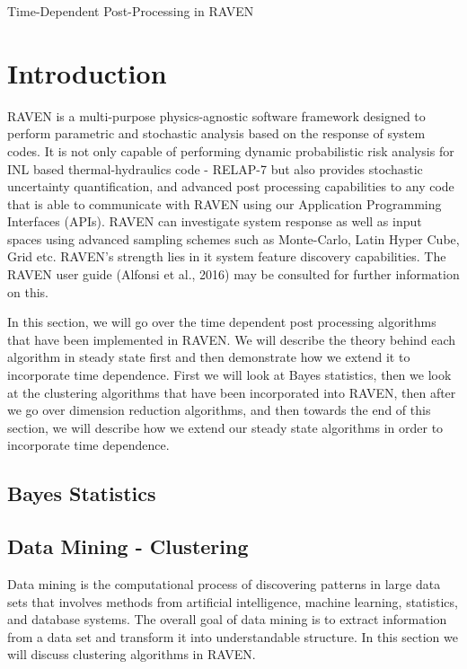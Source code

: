 \documentclass[11pt]{article}
\begin{document}
\begin{center}
\begin{Huge}

Time-Dependent Post-Processing in RAVEN

\end{Huge}
\end{center}

\section{Introduction}

RAVEN is a multi-purpose physics-agnostic software framework designed to perform parametric and stochastic analysis based on the response of system codes. It is not only capable of performing dynamic probabilistic risk analysis for INL based thermal-hydraulics code - RELAP-7 but also provides stochastic uncertainty quantification, and advanced post processing capabilities to any code that is able to communicate with RAVEN using our Application Programming Interfaces (APIs). RAVEN can investigate system response as well as input spaces using advanced sampling schemes such as Monte-Carlo, Latin Hyper Cube, Grid etc. RAVEN's strength lies in it system feature discovery capabilities. The RAVEN user guide (Alfonsi et al., 2016) may be consulted for further information on this.

In this section, we will go over the time dependent post processing algorithms that have been implemented in RAVEN. We will describe the theory behind each algorithm in steady state first and then demonstrate how we extend it to incorporate time dependence. First we will look at Bayes statistics, then we look at the clustering algorithms that have been incorporated into RAVEN, then after we go over dimension reduction algorithms, and then towards the end of this section, we will describe how we extend our steady state algorithms in order to incorporate time dependence.  

\subsection{Bayes Statistics}



\subsection{Data Mining - Clustering}

Data mining is the computational process of discovering patterns in large data sets that involves methods from artificial intelligence, machine learning, statistics, and database systems. The overall goal of data mining is to extract information from a data set and transform it into understandable structure. In this section we will discuss clustering algorithms in RAVEN. 
\end{document}
